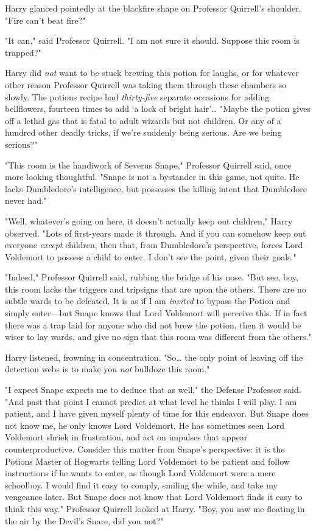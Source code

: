 Harry glanced pointedly at the blackfire shape on Professor Quirrell's
shoulder. "Fire can't beat fire?"

"It can," said Professor Quirrell. "I am not sure it should. Suppose this room
is trapped?"

Harry did \emph{not} want to be stuck brewing this potion for laughs, or for
whatever other reason Professor Quirrell was taking them through these chambers
so slowly. The potions recipe had \emph{thirty-five} separate occasions for
adding bellflowers, fourteen times to add `a lock of bright hair'{\ldots}
"Maybe the potion gives off a lethal gas that is fatal to adult wizards but not
children. Or any of a hundred other deadly tricks, if we're suddenly being
serious. Are we being serious?"

"This room is the handiwork of Severus Snape," Professor Quirrell said, once
more looking thoughtful. "Snape is not a bystander in this game, not quite. He
lacks Dumbledore's intelligence, but possesses the killing intent that
Dumbledore never had."

"Well, whatever's going on here, it doesn't actually keep out children," Harry
observed. "Lots of first-years made it through. And if you can somehow keep out
everyone \emph{except} children, then that, from Dumbledore's perspective,
forces Lord Voldemort to possess a child to enter. I don't see the point, given
their goals."

"Indeed," Professor Quirrell said, rubbing the bridge of his nose. "But see,
boy, this room lacks the triggers and tripsigns that are upon the others. There
are no subtle wards to be defeated. It is as if I am \emph{invited} to bypass
the Potion and simply enter---but Snape knows that Lord Voldemort will perceive
this. If in fact there was a trap laid for anyone who did not brew the potion,
then it would be wiser to lay wards, and give no sign that this room was
different from the others."

Harry listened, frowning in concentration. "So{\ldots} the only point of
leaving off the detection webs is to make you \emph{not} bulldoze this room."

"I expect Snape expects me to deduce that as well," the Defense Professor said.
"And past that point I cannot predict at what level he thinks I will play. I am
patient, and I have given myself plenty of time for this endeavor. But Snape
does not know me, he only knows Lord Voldemort. He has sometimes seen Lord
Voldemort shriek in frustration, and act on impulses that appear
counterproductive. Consider this matter from Snape's perspective: it is the
Potions Master of Hogwarts telling Lord Voldemort to be patient and follow
instructions if he wants to enter, as though Lord Voldemort were a mere
schoolboy. I would find it easy to comply, smiling the while, and take my
vengeance later. But Snape does not know that Lord Voldemort finds it easy to
think this way." Professor Quirrell looked at Harry. "Boy, you saw me floating
in the air by the Devil's Snare, did you not?"

